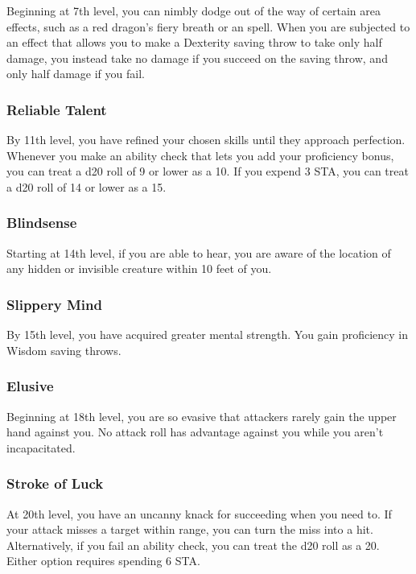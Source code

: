 Beginning at 7th level, you can nimbly dodge out of the way of certain area effects, such as a red dragon's fiery breath or an  spell. When you are subjected to an effect that allows you to make a Dexterity saving throw to take only half damage, you instead take no damage if you succeed on the saving throw, and only half damage if you fail.

\subsubsection{Reliable Talent}

By 11th level, you have refined your chosen skills until they approach perfection. Whenever you make an ability check that lets you add your proficiency bonus, you can treat a d20 roll of 9 or lower as a 10. If you expend 3 STA, you can treat a d20 roll of 14 or lower as a 15.

\subsubsection{Blindsense}

Starting at 14th level, if you are able to hear, you are aware of the location of any hidden or invisible creature within 10 feet of you.

\subsubsection{Slippery Mind}

By 15th level, you have acquired greater mental strength. You gain proficiency in Wisdom saving throws.

\subsubsection{Elusive}

Beginning at 18th level, you are so evasive that attackers rarely gain the upper hand against you. No attack roll has advantage against you while you aren't incapacitated.

\subsubsection{Stroke of Luck}

At 20th level, you have an uncanny knack for succeeding when you need to. If your attack misses a target within range, you can turn the miss into a hit. Alternatively, if you fail an ability check, you can treat the d20 roll as a 20. Either option requires spending 6 STA.

